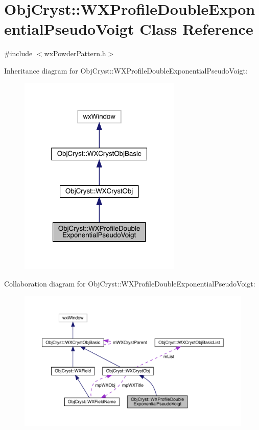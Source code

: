 \hypertarget{class_obj_cryst_1_1_w_x_profile_double_exponential_pseudo_voigt}{}\section{Obj\+Cryst\+::W\+X\+Profile\+Double\+Exponential\+Pseudo\+Voigt Class Reference}
\label{class_obj_cryst_1_1_w_x_profile_double_exponential_pseudo_voigt}


{\ttfamily \#include $<$wx\+Powder\+Pattern.\+h$>$}



Inheritance diagram for Obj\+Cryst\+::W\+X\+Profile\+Double\+Exponential\+Pseudo\+Voigt\+:
\nopagebreak
\begin{figure}[H]
\begin{center}
\leavevmode
\includegraphics[width=220pt]{class_obj_cryst_1_1_w_x_profile_double_exponential_pseudo_voigt__inherit__graph}
\end{center}
\end{figure}


Collaboration diagram for Obj\+Cryst\+::W\+X\+Profile\+Double\+Exponential\+Pseudo\+Voigt\+:
\nopagebreak
\begin{figure}[H]
\begin{center}
\leavevmode
\includegraphics[width=350pt]{class_obj_cryst_1_1_w_x_profile_double_exponential_pseudo_voigt__coll__graph}
\end{center}
\end{figure}
